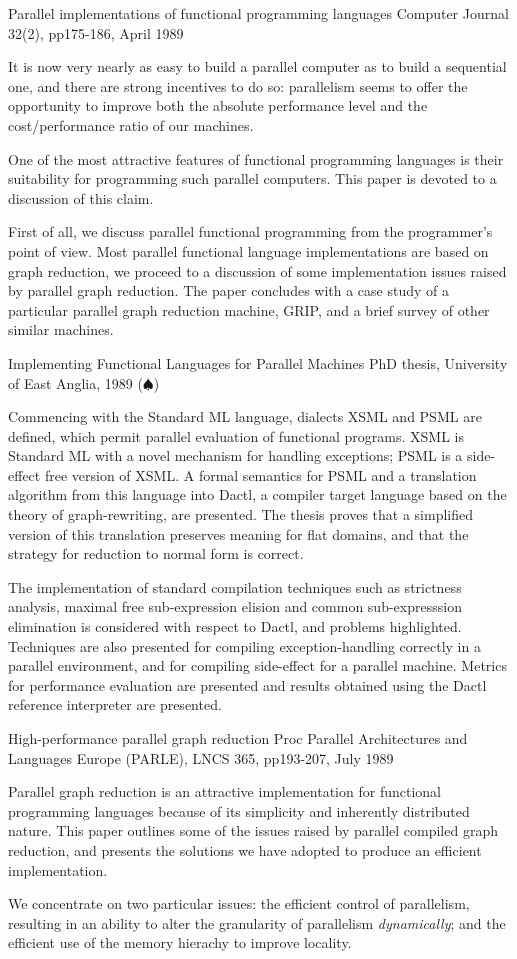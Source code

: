 {Parallel implementations of functional programming languages}
{Computer Journal 32(2), pp175-186, April 1989}
{
It is now very nearly as easy to build a parallel computer
as to build a sequential one, and there are strong incentives to do so:
parallelism seems to offer the opportunity to improve both the 
absolute performance level and the cost/performance ratio of our machines.

One of the most attractive features of functional programming languages
is their suitability for programming such parallel computers.
This paper is devoted to a discussion of this claim.

First of all, we discuss parallel functional programming
from the programmer's point of view.
Most parallel functional language implementations are based on graph reduction,
we proceed to a discussion of some implementation issues raised by parallel 
graph reduction.
The paper concludes with a case study of a particular parallel graph reduction
machine, GRIP, and a brief survey of other similar machines.
}

{Implementing Functional Languages for Parallel Machines}
{PhD thesis, University of East Anglia, 1989 ($\spadesuit$)}
{Commencing with the Standard ML language, dialects  XSML  and  PSML  are
defined,  which permit parallel evaluation of functional programs.  XSML
is Standard ML with a novel mechanism for handling exceptions; PSML is a
side-effect  free  version  of  XSML.  A formal semantics for PSML and a
translation algorithm from this language into Dactl, a  compiler  target
language  based  on  the  theory of graph-rewriting, are presented.  The
thesis proves that a simplified version of  this  translation  preserves
meaning  for flat domains, and that the strategy for reduction to normal
form is correct.

The implementation of standard compilation techniques such as strictness
analysis, maximal free sub-expression elision and common sub-expresssion
elimination  is  considered  with  respect  to   Dactl,   and   problems
highlighted.     Techniques    are    also   presented   for   compiling
exception-handling  correctly  in  a  parallel  environment,   and   for
compiling  side-effect  for a parallel machine.  Metrics for performance
evaluation are presented and results obtained using the Dactl  reference
interpreter are presented.}


{High-performance parallel graph reduction}
{Proc Parallel Architectures and Languages Europe (PARLE), LNCS 365, pp193-207, 
July 1989}
{
Parallel graph reduction is an attractive implementation for functional 
programming languages because of its simplicity and inherently distributed
nature.
This paper outlines some of the issues raised by parallel compiled
graph reduction, and presents the solutions we have adopted to produce an
efficient implementation.

We concentrate on two particular issues:
the efficient control of parallelism, resulting in an ability to alter
the granularity of parallelism 
{\em dynamically};
and the efficient use of the memory hierachy to improve locality.
}

